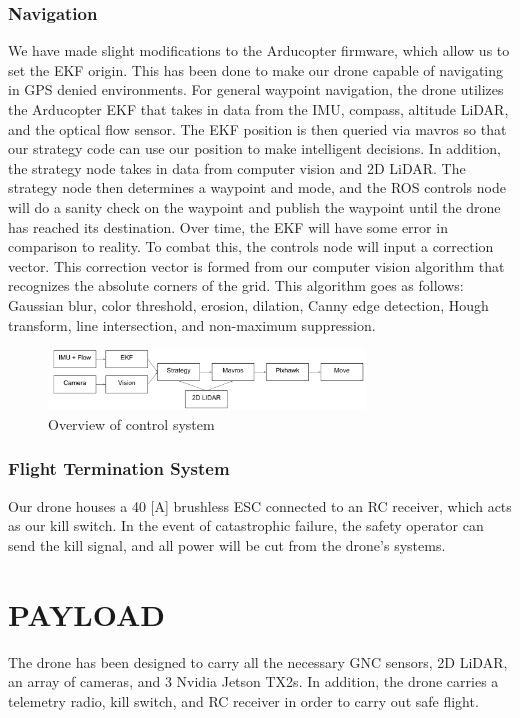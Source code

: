 \documentclass[12pt,letterpaper]{article}
\begin{document}
		\subsubsection*{Navigation}
			We have made slight modifications to the Arducopter firmware, which allow us to set the EKF origin. This has been done to make our drone capable of navigating in GPS denied environments. For general waypoint navigation, the drone utilizes the Arducopter EKF that takes in data from the IMU, compass, altitude LiDAR, and the optical flow sensor. The EKF position is then queried via mavros so that our strategy code can use our position to make intelligent decisions. In addition, the strategy node takes in data from computer vision and 2D LiDAR. The strategy node then determines a waypoint and mode, and the ROS controls node will do a sanity check on the waypoint and publish the waypoint until the drone has reached its destination. Over time, the EKF will have some error in comparison to reality. To combat this, the controls node will input a correction vector. This correction vector is formed from our computer vision algorithm that recognizes the absolute corners of the grid. This algorithm goes as follows: Gaussian blur, color threshold, erosion, dilation, Canny edge detection, Hough transform, line intersection, and non-maximum suppression.

		\begin{figure}[!htbp]
			\begin{center}
				\includegraphics[width=0.75\textwidth]{system}
				\caption*{Overview of control system}
			\end{center}
		\end{figure}

		\subsubsection*{Flight Termination System}
			Our drone houses a 40 [A] brushless ESC connected to an RC receiver, which acts as our kill switch. In the event of catastrophic failure, the safety operator can send the kill signal, and all power will be cut from the drone's systems.


\section*{PAYLOAD}
	The drone has been designed to carry all the necessary GNC sensors, 2D LiDAR, an array of cameras, and 3 Nvidia Jetson TX2s. In addition, the drone carries a telemetry radio, kill switch, and RC receiver in order to carry out safe flight.
\end{document}
